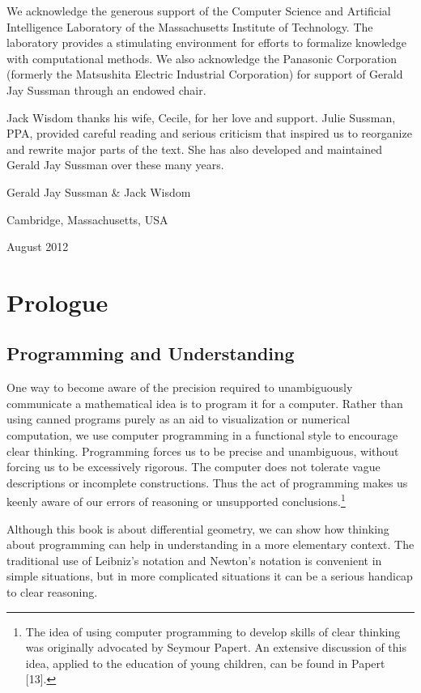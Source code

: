 \documentclass[11pt]{article}
\begin{document}
We acknowledge the generous support of the Computer Science and Artificial
Intelligence Laboratory of the Massachusetts Institute of Technology. The
laboratory provides a stimulating environment for efforts to formalize knowledge
with computational methods. We also acknowledge the Panasonic Corporation
(formerly the Matsushita Electric Industrial Corporation) for support of Gerald
Jay Sussman through an endowed chair.

Jack Wisdom thanks his wife, Cecile, for her love and support. Julie Sussman,
PPA, provided careful reading and serious criticism that inspired us to
reorganize and rewrite major parts of the text. She has also developed and
maintained Gerald Jay Sussman over these many years.

\begin{center}
Gerald Jay Sussman \& Jack Wisdom

Cambridge, Massachusetts, USA

August 2012
\end{center}

\section{Prologue}
\label{sec:org688481c}

\subsection{Programming and Understanding}
\label{sec:orgdd55bb2}

One way to become aware of the precision required to unambiguously communicate a
mathematical idea is to program it for a computer. Rather than using canned
programs purely as an aid to visualization or numerical computation, we use
computer programming in a functional style to encourage clear thinking.
Programming forces us to be precise and unambiguous, without forcing us to be
excessively rigorous. The computer does not tolerate vague descriptions or
incomplete constructions. Thus the act of programming makes us keenly aware of
our errors of reasoning or unsupported conclusions.\footnote{The idea of using computer programming to develop skills of clear
thinking was originally advocated by Seymour Papert. An extensive discussion of
this idea, applied to the education of young children, can be found in Papert
[13].}

Although this book is about differential geometry, we can show how thinking
about programming can help in understanding in a more elementary context. The
traditional use of Leibniz’s notation and Newton’s notation is convenient in
simple situations, but in more complicated situations it can be a serious
handicap to clear reasoning.
\end{document}
